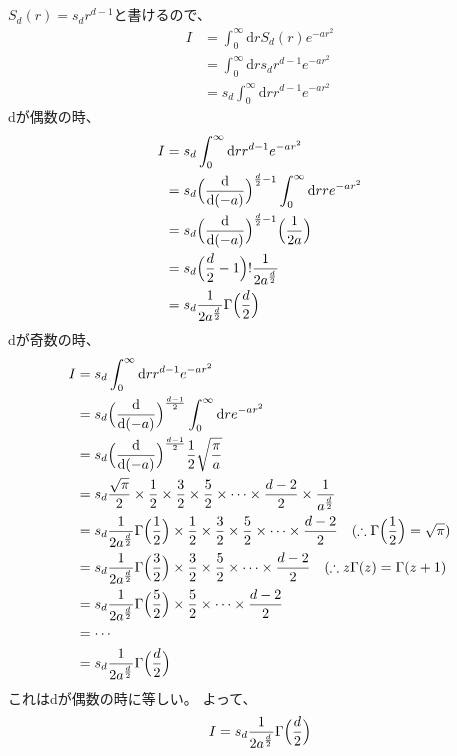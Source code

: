 \documentclass[dvipdfmx,a4paper]{jsarticle}
\begin{document}
\subsection{}
$S_d(r) = s_dr^{d-1}$と書けるので、
\begin{align*}
I &= \int_0^{\infty}\mathrm{d}rS_d(r)e^{-ar^2}\\
&= \int_0^{\infty}\mathrm{d}rs_dr^{d-1}e^{-ar^2}\\
&=s_d\int_0^{\infty}\mathrm{d}r r^{d-1}e^{-ar^2}
\end{align*}
dが偶数の時、
\begin{align*}
I &=s_d\int_0^{\infty}\mathrm{d}r r^{d-1}e^{-ar^2}\\
&=s_d\Bigl(\frac{\mathrm{d}}{\mathrm{d}(-a)}\Bigr)^{\frac{d}{2}-1}\int_0^{\infty}\mathrm{d}r re^{-ar^2}\\
&= s_d\Bigl(\frac{\mathrm{d}}{\mathrm{d}(-a)}\Bigr)^{\frac{d}{2}-1}\Bigl(\frac{1}{2a}\Bigr)\\
&= s_d\Bigl(\frac{d}{2}-1\Bigr)!\frac{1}{2a^{\frac{d}{2}}} \\
&= s_d\frac{1}{2a^{\frac{d}{2}}}\Gamma\Bigl(\frac{d}{2}\Bigr)
\end{align*}
dが奇数の時、
\begin{align*}
I &=s_d\int_0^{\infty}\mathrm{d}r r^{d-1}e^{-ar^2}\\
&=s_d\Bigl(\frac{\mathrm{d}}{\mathrm{d}(-a)}\Bigr)^{\frac{d-1}{2}}\int_0^{\infty}\mathrm{d}  re^{-ar^2}\\
&= s_d\Bigl(\frac{\mathrm{d}}{\mathrm{d}(-a)}\Bigr)^{\frac{d-1}{2}}\frac{1}{2}\sqrt{\frac{\pi}{a}}\\
&= s_d\frac{\sqrt{\pi}}{2}\times\frac{1}{2}\times\frac{3}{2}\times\frac{5}{2}\times\cdots\times\frac{d-2}{2}\times\frac{1}{a^{\frac{d}{2}}}\\
&= s_d\frac{1}{2a^{\frac{d}{2}}}\Gamma\Bigl(\frac{1}{2}\Bigr)\times\frac{1}{2}\times\frac{3}{2}\times\frac{5}{2}\times\cdots\times\frac{d-2}{2}\quad(\therefore\Gamma\Bigl(\frac{1}{2}\Bigr) = \sqrt{\pi})\\
&= s_d\frac{1}{2a^{\frac{d}{2}}}\Gamma\Bigl(\frac{3}{2}\Bigr)\times\frac{3}{2}\times\frac{5}{2}\times\cdots\times\frac{d-2}{2}\quad(\therefore z\Gamma(z) = \Gamma(z + 1)\\
&= s_d\frac{1}{2a^{\frac{d}{2}}}\Gamma\Bigl(\frac{5}{2}\Bigr)\times\frac{5}{2}\times\cdots\times\frac{d-2}{2}\\
&= \cdots\\
&= s_d\frac{1}{2a^{\frac{d}{2}}}\Gamma\Bigl(\frac{d}{2}\Bigr)
\end{align*}
これはdが偶数の時に等しい。
よって、$$I = s_d\frac{1}{2a^{\frac{d}{2}}}\Gamma\Bigl(\frac{d}{2}\Bigr) $$
\\
\end{document}

